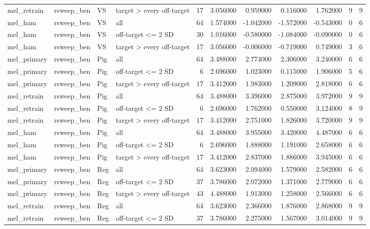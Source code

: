 \begin{table}
\begin{tabular}{llllrrrrrrr}
mel\_retrain & rsweep\_ben & VS & target > every off-target & 17 & 3.056000 & 0.959000 & 0.116000 & 1.762000 & 9 & 9 \\
mel\_ham & rsweep\_ben & VS & all & 64 & 1.574000 & -1.042000 & -1.572000 & -0.543000 & 0 & 6 \\
mel\_ham & rsweep\_ben & VS & off-target <= 2 SD & 30 & 1.016000 & -0.580000 & -1.084000 & -0.090000 & 0 & 6 \\
mel\_ham & rsweep\_ben & VS & target > every off-target & 17 & 3.056000 & -0.006000 & -0.719000 & 0.749000 & 3 & 6 \\
mel\_primary & rsweep\_ben & Pig & all & 64 & 3.488000 & 2.774000 & 2.306000 & 3.240000 & 6 & 6 \\
mel\_primary & rsweep\_ben & Pig & off-target <= 2 SD & 6 & 2.696000 & 1.023000 & 0.115000 & 1.906000 & 5 & 6 \\
mel\_primary & rsweep\_ben & Pig & target > every off-target & 17 & 3.412000 & 1.983000 & 1.209000 & 2.818000 & 6 & 6 \\
mel\_retrain & rsweep\_ben & Pig & all & 64 & 3.488000 & 3.396000 & 2.875000 & 3.972000 & 9 & 9 \\
mel\_retrain & rsweep\_ben & Pig & off-target <= 2 SD & 6 & 2.696000 & 1.762000 & 0.550000 & 3.124000 & 8 & 9 \\
mel\_retrain & rsweep\_ben & Pig & target > every off-target & 17 & 3.412000 & 2.751000 & 1.826000 & 3.720000 & 9 & 9 \\
mel\_ham & rsweep\_ben & Pig & all & 64 & 3.488000 & 3.955000 & 3.420000 & 4.487000 & 6 & 6 \\
mel\_ham & rsweep\_ben & Pig & off-target <= 2 SD & 6 & 2.696000 & 1.888000 & 1.191000 & 2.658000 & 6 & 6 \\
mel\_ham & rsweep\_ben & Pig & target > every off-target & 17 & 3.412000 & 2.837000 & 1.886000 & 3.945000 & 6 & 6 \\
mel\_primary & rsweep\_ben & Reg & all & 64 & 3.623000 & 2.094000 & 1.579000 & 2.582000 & 6 & 6 \\
mel\_primary & rsweep\_ben & Reg & off-target <= 2 SD & 37 & 3.786000 & 2.072000 & 1.371000 & 2.779000 & 6 & 6 \\
mel\_primary & rsweep\_ben & Reg & target > every off-target & 43 & 4.488000 & 1.913000 & 1.258000 & 2.566000 & 6 & 6 \\
mel\_retrain & rsweep\_ben & Reg & all & 64 & 3.623000 & 2.366000 & 1.876000 & 2.868000 & 9 & 9 \\
mel\_retrain & rsweep\_ben & Reg & off-target <= 2 SD & 37 & 3.786000 & 2.275000 & 1.567000 & 3.014000 & 9 & 9 \\

\end{tabular}
\end{table}

